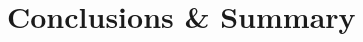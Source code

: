 \documentclass[conference]{IEEEtran}
\begin{document}


\section{Conclusions \& Summary}






%
%




%
%
%
%




\end{document}
